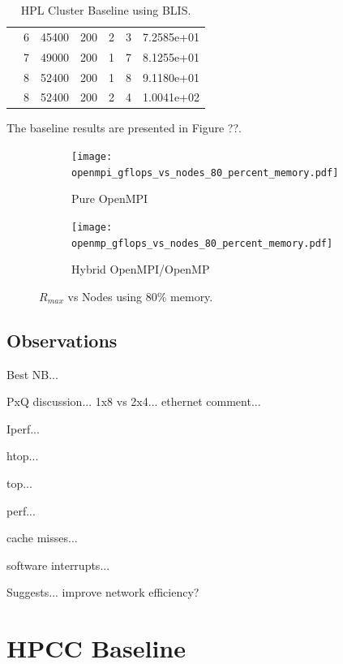 \documentclass{report}
\begin{document}
\begin{table}
\begin{center}
\begin{tabular}{ |l|c|c|c|c|c|c| }
                & 6 & 45400 & 200 & 2 & 3 & 7.2585e+01 \\ 
                \cline{2-7} 
                & 7 & 49000 & 200 & 1 & 7 & 8.1255e+01 \\ 
                \cline{2-7} 
                & 8 & 52400 & 200 & 1 & 8 & 9.1180e+01 \\ 
                & 8 & 52400 & 200 & 2 & 4 & 1.0041e+02 \\ 
\hline
\end{tabular}
\end{center}
\caption{\label{tab:table-name}HPL Cluster Baseline using BLIS.}
\end{table}



The baseline results are presented in Figure ??.

\begin{figure}[H]
	\begin{subfigure}{1.0\textwidth}
		\centering
		\texttt{[image: openmpi\_gflops\_vs\_nodes\_80\_percent\_memory.pdf]}
		\caption{Pure OpenMPI}
		\label{fig:subim1}
	\end{subfigure}
	\par\bigskip
	\begin{subfigure}{1.0\textwidth}
		\centering
		\texttt{[image: openmp\_gflops\_vs\_nodes\_80\_percent\_memory.pdf]}
		\caption{Hybrid OpenMPI/OpenMP}
		\label{fig:subim2}
	\end{subfigure}
\caption{$R_{max}$ vs Nodes using 80\% memory.}
\label{fig:image2}
\end{figure}


%
%
\subsection{Observations}

Best NB...

PxQ discussion... 1x8 vs 2x4... ethernet comment...

Iperf...

htop...

top...

perf...

cache misses...

software interrupts...

Suggests... improve network efficiency?



%
%
\section{HPCC Baseline}
\end{document}
